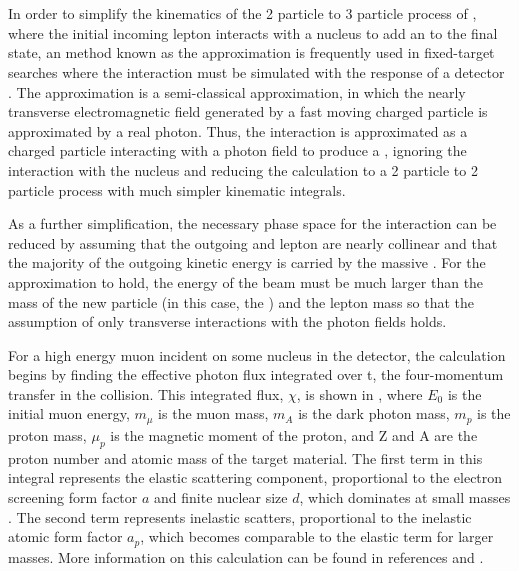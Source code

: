 \section{\ww}
\label{sec:wwApprox}
In order to simplify the kinematics of the 2 particle to 3 particle process of \dbrem, where the initial incoming lepton interacts with a nucleus to add an \aprime to the final state, an method known as the \ww approximation \cite{vonWeizsacker:1934nji,Williams:1935dka} is frequently used in fixed-target searches where the interaction must be simulated with the response of a detector \cite{Bjorken_2009,Andreas_2012}.
The \ww approximation is a semi-classical approximation, in which the nearly transverse electromagnetic field generated by a fast moving charged particle is approximated by a real photon. 
Thus, the interaction is approximated as a charged particle interacting with a photon field to produce a \aprime, ignoring the interaction with the nucleus and reducing the calculation to a 2 particle to 2 particle process with much simpler kinematic integrals.

As a further simplification, the necessary phase space for the interaction can be reduced by assuming that the outgoing \aprime and lepton are nearly collinear and that the majority of the outgoing kinetic energy is carried by the massive \aprime.
For the approximation to hold, the energy of the beam must be much larger than the mass of the new particle (in this case, the \aprime) and the lepton mass so that the assumption of only transverse interactions with the photon fields holds. 

For a high energy muon incident on some nucleus in the detector, the calculation begins by finding the effective photon flux integrated over t, the four-momentum transfer in the collision. 
This integrated flux, $\chi$, is shown in , where $E_0$ is the initial muon energy, $m_\mu$ is the muon mass, $m_A$ is the dark photon mass, $m_p$ is the proton mass, $\mu_p$ is the magnetic moment of the proton, and Z and A are the proton number and atomic mass of the target material.
The first term in this integral represents the  elastic scattering component, proportional to the electron screening form factor $a$ and finite nuclear size $d$, which dominates at small \aprime masses .
The second term represents inelastic scatters, proportional to the inelastic atomic form factor $a_p$, which becomes comparable to the elastic term for larger \aprime masses.
More information on this calculation can be found in references \cite{kim_1973} and \cite{tsai_1974}. 

